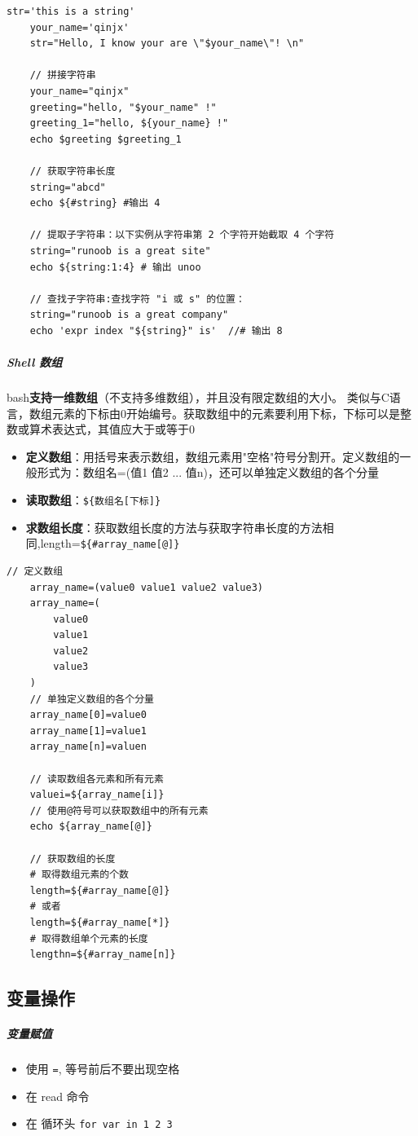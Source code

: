 \documentclass[UTF8,a4paper,12pt]{ctexbook}
\begin{document}
				\begin{lstlisting}[xleftmargin=.06\textwidth]
	str='this is a string'
	your_name='qinjx'
	str="Hello, I know your are \"$your_name\"! \n"
	
	// 拼接字符串
	your_name="qinjx"
	greeting="hello, "$your_name" !"
	greeting_1="hello, ${your_name} !"
	echo $greeting $greeting_1
	
	// 获取字符串长度 
	string="abcd"
	echo ${#string} #输出 4
	
	// 提取子字符串：以下实例从字符串第 2 个字符开始截取 4 个字符
	string="runoob is a great site"
	echo ${string:1:4} # 输出 unoo
	
	// 查找子字符串:查找字符 "i 或 s" 的位置：
	string="runoob is a great company"
	echo 'expr index "${string}" is'  //# 输出 8
					\end{lstlisting}
					
				\subparagraph{Shell 数组}
					bash\textbf{支持一维数组}（不支持多维数组），并且没有限定数组的大小。
					类似与C语言，数组元素的下标由0开始编号。获取数组中的元素要利用下标，下标可以是整数或算术表达式，其值应大于或等于0
					\begin{itemize}
						\item  \textbf{定义数组}：用括号来表示数组，数组元素用"空格"符号分割开。定义数组的一般形式为：数组名=(值1 值2 ... 值n)，还可以单独定义数组的各个分量
						 
						\item  \textbf{读取数组}：\verb|${数组名[下标]}|
						\item  \textbf{求数组长度}：获取数组长度的方法与获取字符串长度的方法相同,length=\verb|${#array_name[@]}|
					\end{itemize}
				
					\begin{lstlisting}[xleftmargin=.06\textwidth]
	// 定义数组
	array_name=(value0 value1 value2 value3)
	array_name=(
		value0
		value1
		value2
		value3
	)
	// 单独定义数组的各个分量
	array_name[0]=value0
	array_name[1]=value1
	array_name[n]=valuen
	
	// 读取数组各元素和所有元素
	valuei=${array_name[i]}
	// 使用@符号可以获取数组中的所有元素
	echo ${array_name[@]}
	
	// 获取数组的长度 
	# 取得数组元素的个数
	length=${#array_name[@]}
	# 或者
	length=${#array_name[*]}
	# 取得数组单个元素的长度
	lengthn=${#array_name[n]}
					\end{lstlisting}
							
		\subsection{变量操作}
			\subparagraph{变量赋值}
				\begin{itemize}[itemindent = 1em]
					\item 使用 \verb|=|, 等号前后不要出现空格
					\item 在 read 命令
					\item 在 循环头 \verb|for var in 1 2 3|
				\end{itemize}
					
\end{document}
